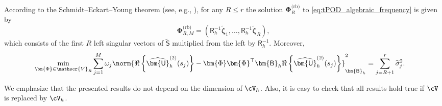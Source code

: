 According to the Schmidt--Eckart--Young theorem (see, e.g.,
\cite[Proposition~6.2]{quarteroni2015reduced}), for any $R\leq r$ the solution
$\bm{\Phi}^{\textrm{(rb)}}_R$ to \eqref{eq:tPOD_algebraic_frequency} is given by
\begin{equation}\label{eq:reduced_basis_Phi}
	\bm{\Phi}^{\textrm{(rb)}}_{R,M}
	=
	\left(
		\bm{\mathsf{R}}^{-1}_h\widetilde{\boldsymbol{\zeta}}_1,
		\ldots,
		\bm{\mathsf{R}}^{-1}_h\widetilde{\boldsymbol{\zeta}}_{R}
	\right),
\end{equation}
which consists of the first $R$ left singular vectors of $\widetilde{\bm{\mathsf{S}}}$
multiplied from the left by $\bm{\mathsf{R}}^{-1}_h$. Moreover,
\begin{equation}\label{eq:error_SVD}
\begin{aligned}
	\min_{\bm{\Phi} \in \mathscr{V}_{R}}
	\sum_{j=1}^{M}
	\omega_j
	\norm{
		\Re\left\{\widehat{\bm{\mathsf{U}}}_h^{(2)}(s_j)\right\}
		-
		\bm{\Phi}\bm{\Phi}^\top
		\bm{\mathsf{B}}_h
		\Re\left\{\widehat{\bm{\mathsf{U}}}_h^{(2)}(s_j)\right\}
	}^2_{\bm{\mathsf{B}}_h}
	&=
	\sum_{j=R+1}^r \widetilde{\sigma}_j^2.
\end{aligned}
\end{equation}

\begin{remark}
We emphasize that the presented results do not depend on the dimension of $\cV_h$. Also, it is easy to check that all results hold true if $\cV$ is replaced by $\cV_h$.
\end{remark}


